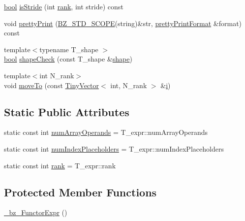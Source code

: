\begin{DoxyCompactItemize}
\item 
\hyperlink{compiler_8h_abb452686968e48b67397da5f97445f5b}{bool} \hyperlink{class__bz__FunctorExpr_a003444bb4f713fadc8cb848c4172d236}{is\+Stride} (int \hyperlink{class__bz__FunctorExpr_a34e5b88b9c07345c11118510630102ce}{rank}, int stride) const 
\item 
void \hyperlink{class__bz__FunctorExpr_abd7eda5df165026fd1af17da3aa5c552}{pretty\+Print} (\hyperlink{numinquire_8h_a2b24ffc3b4ef9803956bc7715c6c7b83}{B\+Z\+\_\+\+S\+T\+D\+\_\+\+S\+C\+O\+P\+E}(string)\&str, \hyperlink{classprettyPrintFormat}{pretty\+Print\+Format} \&format) const 
\item 
{\footnotesize template$<$typename T\+\_\+shape $>$ }\\\hyperlink{compiler_8h_abb452686968e48b67397da5f97445f5b}{bool} \hyperlink{class__bz__FunctorExpr_ab3ca5e2fb02927465327265d7cd4a5be}{shape\+Check} (const T\+\_\+shape \&\hyperlink{shape_8h_a9d9da3dcaecbbde6cf1961063f2e838b}{shape})
\item 
{\footnotesize template$<$int N\+\_\+rank$>$ }\\void \hyperlink{class__bz__FunctorExpr_a59c0f7aad51235c81aa8b4791d868bdd}{move\+To} (const \hyperlink{classTinyVector}{Tiny\+Vector}$<$ int, N\+\_\+rank $>$ \&\hyperlink{indexexpr_8h_aabd77643995707c185e95c8cb2782c81}{i})
\end{DoxyCompactItemize}
\subsection*{Static Public Attributes}
\begin{DoxyCompactItemize}
\item 
static const int \hyperlink{class__bz__FunctorExpr_a5313793b92e83ed68924f338d35aa638}{num\+Array\+Operands} = T\+\_\+expr\+::num\+Array\+Operands
\item 
static const int \hyperlink{class__bz__FunctorExpr_a83a2df4fa96618cd48e31b8b7e1fd0a2}{num\+Index\+Placeholders} = T\+\_\+expr\+::num\+Index\+Placeholders
\item 
static const int \hyperlink{class__bz__FunctorExpr_a34e5b88b9c07345c11118510630102ce}{rank} = T\+\_\+expr\+::rank
\end{DoxyCompactItemize}
\subsection*{Protected Member Functions}
\begin{DoxyCompactItemize}
\item 
\hyperlink{class__bz__FunctorExpr_a636381b0820c06efecabb5cc2be11d4b}{\+\_\+bz\+\_\+\+Functor\+Expr} ()
\end{DoxyCompactItemize}

